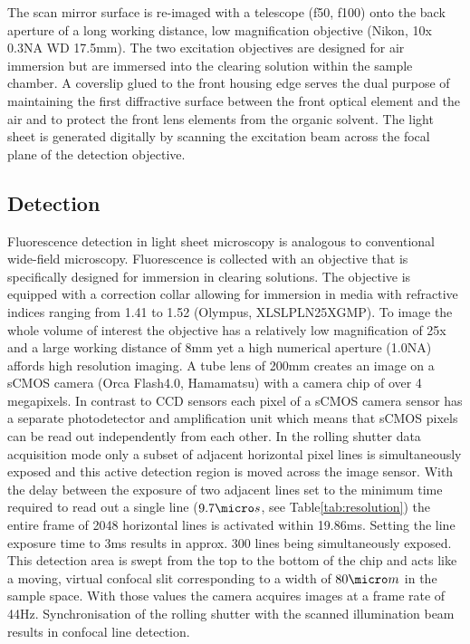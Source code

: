 \documentclass[12pt]{spieman}  %
\begin{document}
The scan mirror surface is re-imaged with a telescope (f50, f100) onto the back aperture of a long working distance, low magnification objective (Nikon, 10x 0.3NA WD 17.5mm). The two excitation objectives are designed for air immersion but are immersed into the clearing solution within the sample chamber. A coverslip glued to the front housing edge serves the dual purpose of maintaining the first diffractive surface between the front optical element and the air and to protect the front lens elements from the organic solvent. The light sheet is generated digitally\cite{Keller2008a,Keller2008b} by scanning the excitation beam across the focal plane of the detection objective. %

	
\subsection{Detection}
		
Fluorescence detection in light sheet microscopy is analogous to conventional wide-field microscopy. Fluorescence is collected with an objective that is specifically designed for immersion in clearing solutions. The objective is equipped with a correction collar allowing for immersion in media with refractive indices ranging from 1.41 to 1.52 (Olympus, XLSLPLN25XGMP). To image the whole volume of interest the objective has a relatively low magnification of 25x and a large working distance of 8mm yet a high numerical aperture (1.0NA) affords high resolution imaging. A tube lens of 200mm creates an image on a sCMOS camera (Orca Flash4.0, Hamamatsu) with a camera chip of over 4 megapixels. In contrast to CCD sensors each pixel of a sCMOS camera sensor has a separate photodetector and amplification unit which means that sCMOS pixels can be read out independently from each other. In the rolling shutter data acquisition mode only a subset of adjacent horizontal pixel lines is simultaneously exposed and this active detection region is moved across the image sensor. With the delay between the exposure of two adjacent lines set to the minimum time required to read out a single line ($9.7\micro s$, see Table\ref{tab:resolution}) the entire frame of 2048 horizontal lines is activated within 19.86ms. Setting the line exposure time to 3ms results in approx. 300 lines being simultaneously exposed. This detection area is swept from the top to the bottom of the chip and acts like a moving, virtual confocal slit corresponding to a width of $80\micro m$ in the sample space. With those values the camera acquires images at a frame rate of 44Hz. Synchronisation of the rolling shutter with the scanned illumination beam results in confocal line detection\cite{Baumgart2012}. 
\end{document}
